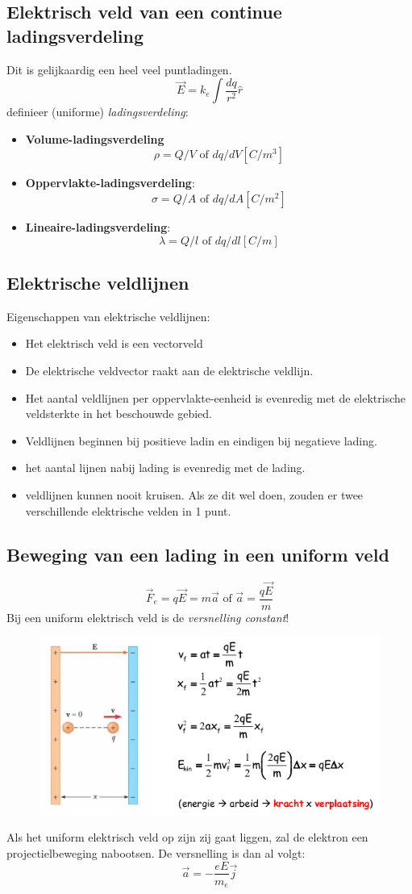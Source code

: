 \documentclass[12pt,a4paper]{article}
\begin{document}
	\subsection{Elektrisch veld van een continue ladingsverdeling}
	Dit is gelijkaardig een heel veel puntladingen. 
	\[\vec{E} = k_e\int\frac{dq}{r^2}\hat{r}\]
	definieer (uniforme) \textit{ladingsverdeling}:
	\begin{itemize}
		\item \textbf{Volume-ladingsverdeling}
		 \[\rho = Q/V \text{ of } dq/dV [C/m^3]\]
		\item \textbf{Oppervlakte-ladingsverdeling}:
		 \[\sigma = Q/A \text{ of } dq/dA [C/m^2]\]
		\item \textbf{Lineaire-ladingsverdeling}:
		 \[\lambda = Q/l \text{ of } dq/dl [C/m]\]
	\end{itemize}
	\subsection{Elektrische veldlijnen}
	Eigenschappen van elektrische veldlijnen:
	\begin{itemize}
		\renewcommand\labelitemi{--}
		\item Het elektrisch veld is een vectorveld
		\item De elektrische veldvector raakt aan de elektrische veldlijn.
		\item Het aantal veldlijnen per oppervlakte-eenheid is evenredig met de elektrische veldsterkte in het beschouwde gebied.
		\item Veldlijnen beginnen bij positieve ladin en eindigen bij negatieve lading.
		\item het aantal lijnen nabij lading is evenredig met de lading.
		\item veldlijnen kunnen nooit kruisen. Als ze dit wel doen, zouden er twee verschillende elektrische velden in 1 punt. 
	\end{itemize}
	\subsection{Beweging van een lading in een uniform veld}
	\[\vec{F}_e = q\vec{E} = m\vec{a} \text{  of  } \vec{a}=\frac{q\vec{E}}{m}\]
	Bij een uniform elektrisch veld is de \textit{versnelling constant}!
	\begin{figure}[h]
		\centering
		\includegraphics[width=0.7\linewidth]{uniform-elektrisch-veld}
		\label{fig:uniform-elektrisch-veld}
	\end{figure}
	Als het uniform elektrisch veld op zijn zij gaat liggen, zal de elektron een projectielbeweging nabootsen. De versnelling is dan al volgt: 
	\[\vec{a}=-\frac{eE}{m_e}\vec{j}\]
	
\end{document}
